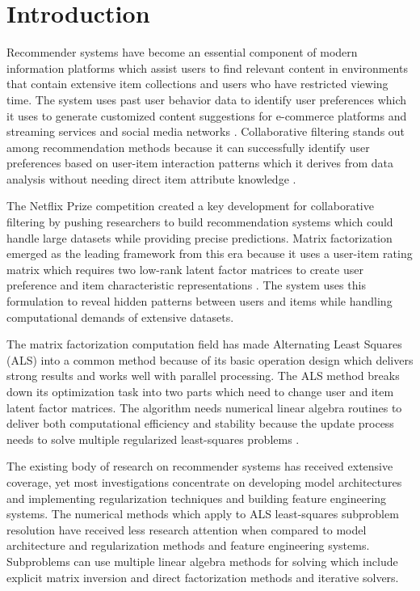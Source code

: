\documentclass[12pt,a4paper]{report}
\begin{document}
\chapter*{Introduction}

Recommender systems have become an essential component of modern information platforms which assist users to find relevant content in environments that contain extensive item collections and users who have restricted viewing time. The system uses past user behavior data to identify user preferences which it uses to generate customized content suggestions for e-commerce platforms and streaming services and social media networks \parencite{ricci2015recommender}. Collaborative filtering stands out among recommendation methods because it can successfully identify user preferences based on user-item interaction patterns which it derives from data analysis without needing direct item attribute knowledge \parencite{koren2009matrix}.

The Netflix Prize competition created a key development for collaborative filtering by pushing researchers to build recommendation systems which could handle large datasets while providing precise predictions. Matrix factorization emerged as the leading framework from this era because it uses a user-item rating matrix which requires two low-rank latent factor matrices to create user preference and item characteristic representations \parencite{koren2009matrix,takacs2009scalable}. The system uses this formulation to reveal hidden patterns between users and items while handling computational demands of extensive datasets.

The matrix factorization computation field has made Alternating Least Squares (ALS) into a common method because of its basic operation design which delivers strong results and works well with parallel processing. The ALS method breaks down its optimization task into two parts which need to change user and item latent factor matrices. The algorithm needs numerical linear algebra routines to deliver both computational efficiency and stability because the update process needs to solve multiple regularized least-squares problems \parencite{zhou2008large}.

The existing body of research on recommender systems has received extensive coverage, yet most investigations concentrate on developing model architectures and implementing regularization techniques and building feature engineering systems. The numerical methods which apply to ALS least-squares subproblem resolution have received less research attention when compared to model architecture and regularization methods and feature engineering systems. Subproblems can use multiple linear algebra methods for solving which include explicit matrix inversion and direct factorization methods and iterative solvers.
\end{document}

